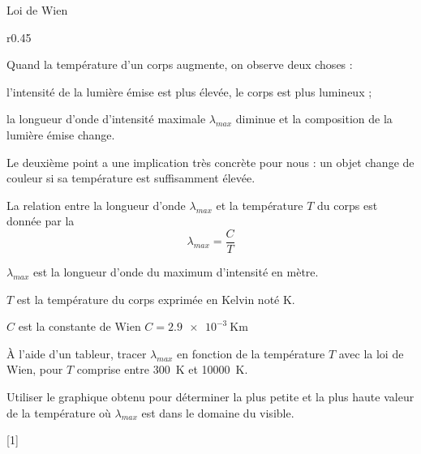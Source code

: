 \vspace*{-4pt}
\begin{doc}{Loi de Wien}
  \begin{wrapfigure}[10]{r}{0.45\linewidth}
    \vspace*{-28pt}
    \centering
  \end{wrapfigure}
  
  Quand la température d'un corps augmente, on observe deux choses :
  \begin{listeTirets}
    \item l'intensité de la lumière émise est plus élevée, le corps est plus lumineux ;
    \item la longueur d'onde d'intensité maximale $\lambda_{max}$ diminue et la composition de la lumière émise change.
  \end{listeTirets}
  Le deuxième point a une implication très concrète pour nous : un objet change de couleur si sa température est suffisamment élevée.

  \begin{importants}
    La relation entre la longueur d'onde $\lambda_{max}$ et la température $T$ du corps est donnée par la 
    \begin{equation*}
      \lambda_{max} = \dfrac{C}{T}
    \end{equation*}
    \begin{listePoints}
      \item $\lambda_{max}$ est la longueur d'onde du maximum d'intensité en mètre.
      \item $T$ est la température du corps exprimée en Kelvin noté \unit{\kelvin}.
      \item $C$ est la constante de Wien $C = \qty{2,9e-3}{\kelvin\m}$
    \end{listePoints}
  \end{importants}
\end{doc}

\programmation
À l'aide d'un tableur, tracer $\lambda_{max}$ en fonction de la température $T$ avec la loi de Wien, pour $T$ comprise entre \qty{300}{\kelvin} et \qty{10000}{\kelvin}.

\mesure
Utiliser le graphique obtenu pour déterminer la plus petite et la plus haute valeur de la température où $\lambda_{max}$ est dans le domaine du visible.

[1]